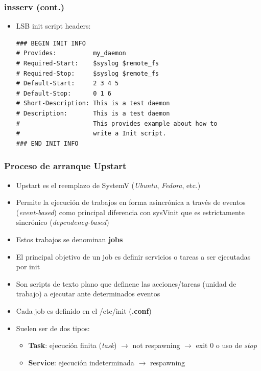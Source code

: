 \begin{frame}[fragile]
  \frametitle{\textbf{insserv} (cont.)}
  \begin{itemize}
	  	\item LSB init script headers:
		\begin{lstlisting}
### BEGIN INIT INFO
# Provides:          my_daemon
# Required-Start:    $syslog $remote_fs
# Required-Stop:     $syslog $remote_fs
# Default-Start:     2 3 4 5
# Default-Stop:      0 1 6
# Short-Description: This is a test daemon
# Description:       This is a test daemon
#                    This provides example about how to
#                    write a Init script.
### END INIT INFO
		\end{lstlisting}
  \end{itemize}
\end{frame}

\begin{frame}
  \frametitle{Proceso de arranque \textbf{Upstart}}
  \begin{itemize}
	  	\item Upstart es el reemplazo de SystemV (\emph{Ubuntu}, \emph{Fedora}, etc.)
	  	\item Permite la ejecución de trabajos en forma asincrónica a través de eventos (\textit{event-based}) como principal diferencia con sysVinit que es estrictamente sincrónico (\textit{dependency-based})
	  	\item Estos trabajos se denominan \textbf{jobs}
		\item El principal objetivo de un job es definir servicios o tareas a ser ejecutadas por init
		\item Son scripts de texto plano que definene las acciones/tareas (unidad de trabajo) a ejecutar ante determinados eventos		
	  	\item Cada job es definido en el /etc/init (\textbf{.conf})
	  	\item Suelen ser de dos tipos:
	  	\begin{itemize}
	  		\item \textbf{Task}: ejecución finita (\textit{task}) $\rightarrow$ not respawning $\rightarrow$ exit 0 o uso de \textit{stop}
	  		\item \textbf{Service}: ejecución indeterminada $\rightarrow$ respawning
	  	\end{itemize}	  	
  \end{itemize}
\end{frame}

